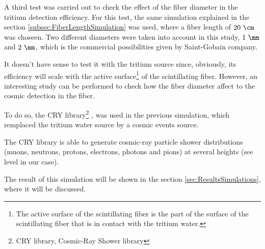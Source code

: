 A third test was carried out to check the effect of the fiber diameter in the tritium detection efficiency. For this test, the same simulation explained in the section \ref{subsec:FiberLengthSimulation} was used, where a fiber length of $20~\cm$ was choseen. Two different diameters were taken into account in this study, $1~\mm$ and $2~\mm$, which is the commercial possibilities given by Saint-Gobain company.

It doesn't have sense to test it with the tritium source since, obviously, its efficiency will scale with the active surface\footnote{The active surface of the scintillating fiber is the part of the surface of the scintillating fiber that is in contact with the tritium water.} of the scintillating fiber. However, an interesting study can be performed to check how the fiber diameter affect to the cosmic detection in the fiber.

To do so, the CRY library\footnote{CRY library, Cosmic-Ray Shower library} \cite{CRYwebsite}, \cite{CRYpaper} was used in the previous simulation, which remplaced the tritium water source by a cosmic events source. 

The CRY library is able to generate cosmic-ray particle shower distributions (muons, neutrons, protons, electrons, photons and pions) at several heights (see level in our case).

The result of this simulation will be shown in the section \ref{sec:ResultsSimulations}, where it will be discussed.